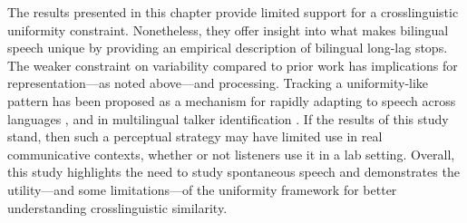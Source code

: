 The results presented in this chapter provide limited support for a crosslinguistic uniformity constraint. Nonetheless, they offer insight into what makes bilingual speech unique by providing an empirical description of bilingual long-lag stops. The weaker constraint on variability compared to prior work has implications for representation---as noted above---and processing. Tracking a uniformity-like pattern has been proposed as a mechanism for rapidly adapting to speech across languages \citep{reinisch_2013_retune}, and in multilingual talker identification \cite{orena_2019_identifying}. If the results of this study stand, then such a perceptual strategy may have limited use in real communicative contexts, whether or not listeners use it in a lab setting. Overall, this study highlights the need to study spontaneous speech and demonstrates the utility---and some limitations---of the uniformity framework for better understanding crosslinguistic similarity. 

\endinput %






